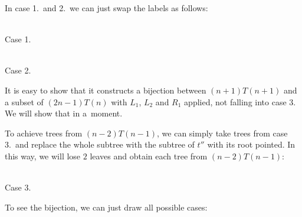 \documentclass[final]{article}
\theoremstyle{definition}
\theoremstyle{definition}
\theoremstyle{remark}
\begin{document}
In case 1.~and 2.~we can just swap the labels as follows:

\begin{center}
    \begin{minipage}[t]{.3\textwidth}
        \begin{center}
            \\
            Case 1.
        \end{center}
    \end{minipage}%
    \begin{minipage}[t]{.3\textwidth}
        \begin{center}
            \\
            Case 2.
        \end{center}
    \end{minipage}%
\end{center}

It is easy to show that it constructs a bijection between \((n + 1) T(n + 1)\) and a subset of \((2 n - 1) T(n)\) with \(L_1\), \(L_2\) and \(R_1\) applied, not falling into case 3. We will show that in a~moment.

To achieve trees from \((n - 2) T(n - 1)\), we can simply take trees from case 3.~and replace the whole subtree with the subtree of \(t''\) with its root pointed. In this way, we will lose \(2\) leaves and obtain each tree from \((n - 2) T(n - 1)\):

\begin{center}
    \begin{minipage}[t]{.3\textwidth}
        \begin{center}
            \\
            Case 3.
        \end{center}
    \end{minipage}%
\end{center}

To see the bijection, we can just draw all possible cases:
\end{document}
